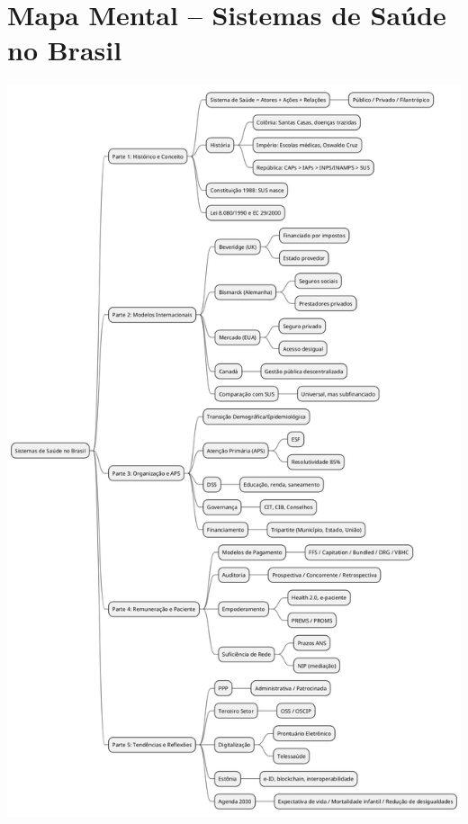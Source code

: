 \documentclass[a4paper,12pt]{article}
\begin{document}
\section{Mapa Mental – Sistemas de Saúde no Brasil}
\label{sec:org968212f}

\begin{center}
\includegraphics[width=.9\linewidth]{sistemas-saude-mapa.png}
\label{org1d1c1ce}
\end{center}
\end{document}
